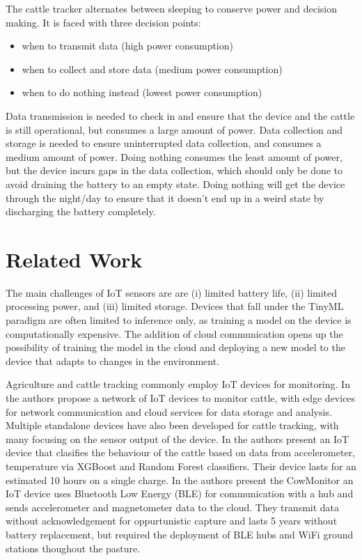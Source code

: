 \documentclass[10pt]{cai}
\begin{document}
The cattle tracker alternates between sleeping to conserve power and decision making. 
It is faced with three decision points: 

\begin{itemize}
  \item when to transmit data (high power consumption)
  \item when to collect and store data (medium power consumption)
  \item when to do nothing instead (lowest power consumption)
\end{itemize}

Data transmission is needed to check in and ensure that the device and the cattle is still operational, but consumes a large amount of power.
Data collection and storage is needed to ensure uninterrupted data collection, and consumes a medium amount of power.
Doing nothing consumes the least amount of power, but the device incurs gaps in the data collection, which should only be done to avoid draining the battery to an empty state.
Doing nothing will get the device through the night/day to ensure that it doesn't end up in a weird state by discharging the battery completely.

\section{Related Work}
The main challenges of IoT sensors are \cite{chenDeepReinforcementLearning2021} are (i) limited battery life, (ii) limited processing power, and (iii) limited storage.
Devices that fall under the TinyML paradigm are often limited to inference only, as training a model on the device is computationally expensive.
The addition of cloud communication opens up the possibility of training the model in the cloud and deploying a new model to the device that adapts to changes in the environment.

Agriculture and cattle tracking commonly employ IoT devices for monitoring. 
In \cite{yamsaniIoTBasedLivestockMonitoring2024} the authors propose a network of IoT devices to monitor cattle, with edge devices for network communication and cloud services for data storage and analysis.
Multiple standalone devices have also been developed for cattle tracking, with many focusing on the sensor output of the device.
In \cite{duttaMOOnitorIoTBased2022} the authors present an IoT device that clasifies the behaviour of the cattle based on data from accelerometer, temperature via XGBoost and Random Forest classifiers.
Their device lasts for an estimated 10 hours on a single charge.
In \cite{unoldIoTBasedCowHealth2020} the authors present the CowMonitor an IoT device uses Bluetooth Low Energy (BLE) for communication with a hub and sends accelerometer and magnetometer data to the cloud.
They transmit data without acknowledgement for oppurtunistic capture and lasts 5 years without battery replacement, but required the deployment of BLE hubs and WiFi ground stations thoughout the pasture.
\end{document}
